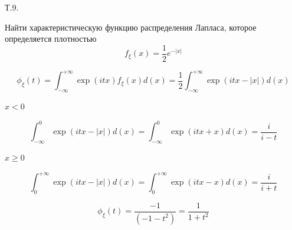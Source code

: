 \documentclass[a4paper,12pt]{article} %
\begin{document}
\begin{example} Т.9. 

Найти характеристическую функцию распределения Лапласа, которое определяется плотностью
$$
f_{\xi}(x)=\frac{1}{2} e^{-|x|}
$$





\[ 	\phi_{\xi}(t)=\int_{-\infty}^{+\infty} \exp (i t x) f_{\xi}(x) d(x)=\frac{1}{2} \int_{-\infty}^{+\infty} \exp (i t x-|x|) d(x) \]



$ x<0$


\[ \int_{-\infty}^{0} \exp (i t x-|x|) d(x)=\int_{-\infty}^{0} \exp (i t x+x) d(x)=\frac{i}{i-t} \]


$ x \geq 0 $



\[ \int_{0}^{+\infty} \exp (i t x-|x|) d(x)=\int_{0}^{+\infty} \exp (i t x-x) d(x)=\frac{i}{i+t} \]



\[ \phi_{\xi}(t)=\frac{-1}{\left(-1-t^{2}\right)}=\frac{1}{1+t^{2}} \]










\end{example}
\end{document}
